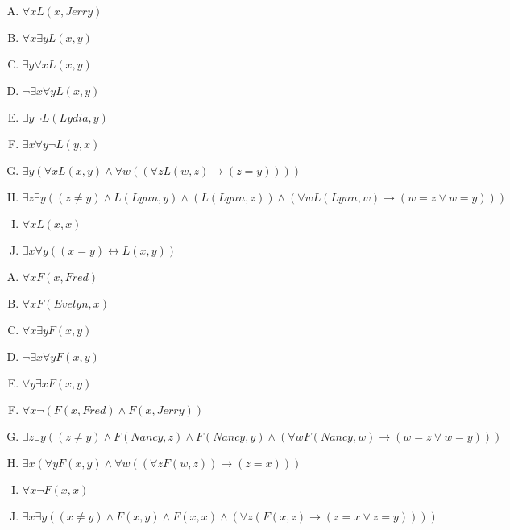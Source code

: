{{        %
        \begin{practices}
            \begin{enumerate}[A.]
                \item $\forall x L(x, Jerry)$
                \item $\forall x \exists y L(x, y)$
                \item $\exists y \forall x L(x, y)$
                \item $\neg \exists x \forall y L(x, y)$
                \item $\exists y \neg L(Lydia, y)$
                \item $\exists x \forall y \neg L(y, x)$
                \item $\exists y (\forall x L(x, y) \wedge \forall w ((\forall z L(w, z) \rightarrow (z = y))))$
                \item $\exists z \exists y ((z \neq y) \wedge L(Lynn, y) \wedge (L(Lynn, z)) \wedge (\forall w L(Lynn, w) \rightarrow (w = z \vee w = y)))$
                \item $\forall x L(x, x)$
                \item $\exists x \forall y ((x = y) \leftrightarrow L(x, y))$
            \end{enumerate}
        \end{practices}

        \begin{practices}
            \begin{enumerate}[A.]
                \item $\forall x F(x, Fred)$
                \item $\forall x F(Evelyn, x)$
                \item $\forall x \exists y F(x, y)$
                \item $\neg \exists x \forall y F(x, y)$
                \item $\forall y \exists x F(x, y)$
                \item $\forall x \neg (F(x, Fred) \wedge F(x, Jerry))$
                \item $\exists z \exists y ((z \neq y) \wedge F(Nancy, z) \wedge F(Nancy, y) \wedge (\forall w F(Nancy, w) \rightarrow (w = z \vee w = y)))$
                \item $\exists x (\forall y F(x, y) \wedge \forall w ((\forall z F(w, z)) \rightarrow (z = x)))$
                \item $\forall x \neg F(x, x)$
                \item $\exists x \exists y ((x \neq y) \wedge F(x, y) \wedge F(x, x) \wedge (\forall z (F(x, z) \rightarrow (z = x \vee z = y))))$
            \end{enumerate}
        \end{practices}

}}
